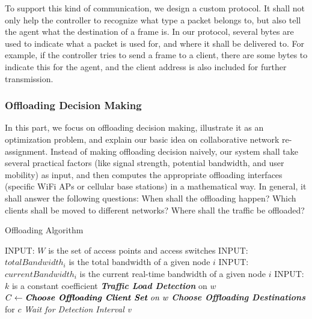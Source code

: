 \documentclass[english]{tktltiki}
\begin{document}
To support this kind of communication, we design a custom protocol. It shall not only help the controller to recognize what type a packet belongs to, but also tell the agent what the destination of a frame is. In our protocol, several bytes are used to indicate what a packet is used for, and where it shall be delivered to. For example, if the controller tries to send a frame to a client, there are some bytes to indicate this for the agent, and the client address is also included for further transmission.

\subsubsection{Offloading Decision Making}

In this part, we focus on offloading decision making, illustrate it as an optimization problem, and explain our basic idea on collaborative network re-assignment. Instead of making offloading decision naively, our system shall take several practical factors (like signal strength, potential bandwidth, and user mobility) as input, and then computes the appropriate offloading interfaces (specific WiFi APs or cellular base stations) in a mathematical way. In general, it shall answer the following questions: When shall the offloading happen? Which clients shall be moved to different networks? Where shall the traffic be offloaded?

\begin{algorithm}
\caption{Offloading Algorithm}
\label{alg:offloading}
\begin{algorithmic}[1]
  \State \uppercase{INPUT:} $W$ is the set of access points and access switches
  \State \uppercase{INPUT:} $totalBandwidth_i$ is the total bandwidth of a given node $i$
  \State \uppercase{INPUT:} $currentBandwidth_i$ is the current real-time bandwidth of a given node $i$
  \State \uppercase{INPUT:} $k$ is a constant coefficient
      \State \textit{\textbf{Traffic Load Detection}} on $w$
        \State $C \gets \textit{\textbf{Choose Offloading Client Set} on w}$
          \State \textit{\textbf{Choose Offloading Destinations}} for $c$
        \EndFor
      \EndIf
    \EndFor
    \State \textit{Wait for Detection Interval v}
  \EndWhile
\EndProcedure
\end{algorithmic}
\end{algorithm}
\end{document}
